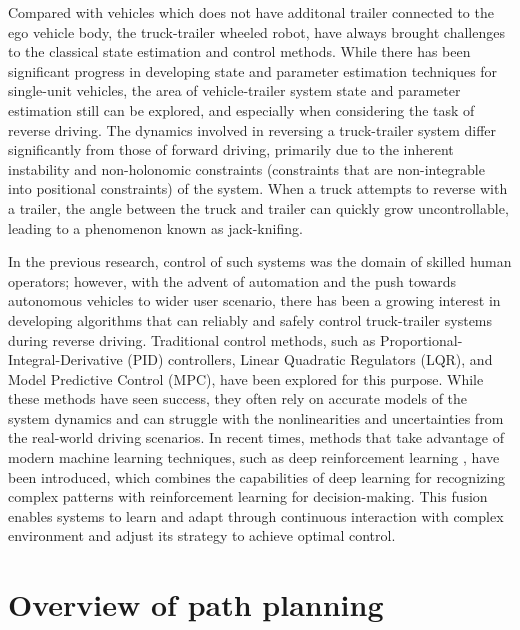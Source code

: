 Compared with vehicles which does not have additonal trailer connected to the ego vehicle body, the truck-trailer wheeled robot, have always brought challenges to the classical state estimation and control methods. While there has been significant progress in developing state and parameter estimation techniques for single-unit vehicles, the area of vehicle-trailer system state and parameter estimation still can be explored, and especially when considering the task of reverse driving. The dynamics involved in reversing a truck-trailer system differ significantly from those of forward driving, primarily due to the inherent instability and non-holonomic constraints (constraints that are non-integrable into positional constraints) of the system. When a truck attempts to reverse with a trailer, the angle between the truck and trailer can quickly grow uncontrollable, leading to a phenomenon known as jack-knifing.

In the previous research, control of such systems was the domain of skilled human operators; however, with the advent of automation and the push towards autonomous vehicles to wider user scenario, there has been a growing interest in developing algorithms that can reliably and safely control truck-trailer systems during reverse driving. Traditional control methods, such as Proportional-Integral-Derivative (PID) controllers, Linear Quadratic Regulators (LQR), and Model Predictive Control (MPC), have been explored for this purpose. While these methods have seen success, they often rely on accurate models of the system dynamics and can struggle with the nonlinearities and uncertainties from the real-world driving scenarios. In recent times, methods that take advantage of modern machine learning techniques, such as deep reinforcement learning , have been introduced, which combines the capabilities of deep learning for recognizing complex patterns with reinforcement learning for decision-making. This fusion enables systems to learn and adapt through continuous interaction with complex environment and adjust its strategy to achieve optimal control.

\section{Overview of path planning}

